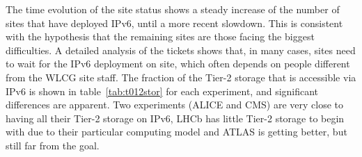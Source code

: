 The time evolution of the site status shows a steady increase of the
number of sites that have deployed IPv6, until a more recent
slowdown. This is consistent with the hypothesis that the remaining
sites are those facing the biggest difficulties. A detailed analysis
of the tickets shows that, in many cases, sites need to wait for the
IPv6 deployment on site, which often depends on people different from
the WLCG site staff. The fraction of the Tier-2 storage that is
accessible via IPv6 is shown in table~\ref{tab:t012stor} for each 
experiment, and significant differences are apparent.
Two experiments (ALICE and CMS) are very close to having all their
Tier-2 storage on IPv6, LHCb has little Tier-2 storage to begin with
due to their particular computing model and ATLAS is getting better,
but still far from the goal.

